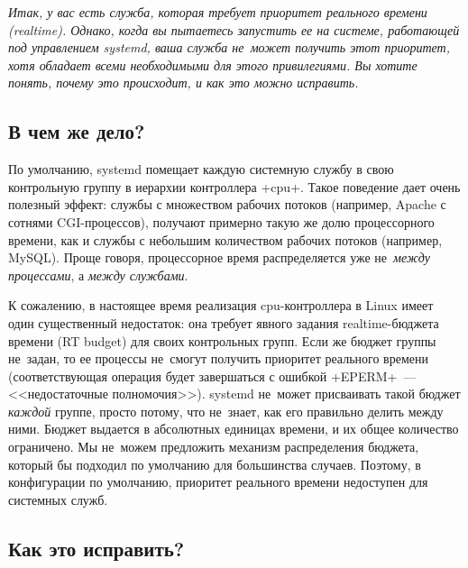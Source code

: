 \documentclass[10pt,oneside,a4paper]{article}
\begin{document}
\emph{Итак, у вас есть служба, которая требует приоритет реального времени
(realtime). Однако, когда вы пытаетесь запустить ее на системе, работающей под
управлением systemd, ваша служба не~может получить этот приоритет, хотя обладает
всеми необходимыми для этого привилегиями. Вы хотите понять, почему это
происходит, и как это можно исправить.}

\subsection*{В чем же дело?}

По умолчанию, systemd помещает каждую системную службу в свою контрольную группу
в иерархии контроллера +cpu+. Такое поведение дает очень полезный эффект: службы
с множеством рабочих потоков (например, Apache с сотнями CGI-процессов),
получают примерно такую же долю процессорного времени, как и службы с небольшим
количеством рабочих потоков (например, MySQL). Проще говоря, процессорное время
распределяется уже не~\emph{между процессами}, а \emph{между службами}.

К сожалению, в настоящее время реализация cpu-контроллера в Linux имеет один
существенный недостаток: она требует явного задания realtime-бюджета времени (RT
budget) для своих контрольных групп. Если же бюджет группы не~задан, то ее
процессы не~смогут получить приоритет реального времени (соответствующая
операция будет завершаться с ошибкой +EPERM+~--- <<недостаточные полномочия>>).
systemd не~может присваивать такой бюджет \emph{каждой} группе, просто потому,
что не~знает, как его правильно делить между ними. Бюджет выдается в абсолютных
единицах времени, и их общее количество ограничено. Мы не~можем предложить
механизм распределения бюджета, который бы подходил по умолчанию для большинства
случаев. Поэтому, в конфигурации по умолчанию, приоритет реального времени
недоступен для системных служб.

\subsection*{Как это исправить?}
\end{document}
